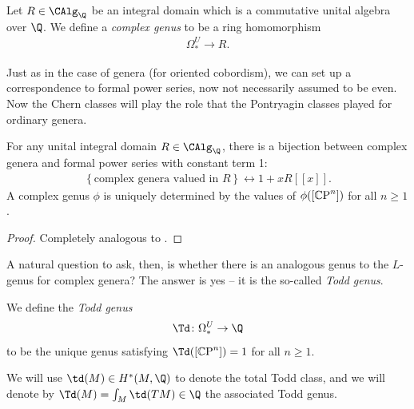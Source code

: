 \documentclass[11pt]{book}
\begin{document}
\begin{definition}\label{def:complex-genera}
Let $R\in \CAlg_\Q$ be an integral domain which is a commutative unital algebra over $\Q$. We define a \emph{complex genus} to be a ring homomorphism
\begin{align*}
    \Omega^U_\ast \to R.
\end{align*}
\end{definition}

Just as in the case of genera (for oriented cobordism), we can set up a correspondence to formal power series, now not necessarily assumed to be even. Now the Chern classes will play the role that the Pontryagin classes played for ordinary genera.

\begin{theorem}\label{thm:complex-genera} For any unital integral domain $R\in\CAlg_\Q$, there is a bijection between complex genera and formal power series with constant term 1:
\begin{align*}
    \left\{ \text{complex genera valued in }R \right\} \leftrightarrow 1 + xR[[x]].
\end{align*}
A complex genus $\phi$ is uniquely determined by the values of $\phi([{\mathbb{C}\text{P}}^n])$ for all $n\ge1$.
\end{theorem}
\begin{proof} Completely analogous to .
\end{proof}

A natural question to ask, then, is whether there is an analogous genus to the $L$-genus for complex genera? The answer is yes -- it is the so-called \emph{Todd genus}.

\begin{definition}\label{def:Todd-genus} We define the \emph{Todd genus}
\begin{align*}
    \Td \colon \Omega^U_\ast \to \Q
\end{align*}
to be the unique genus satisfying $\Td([\CP^n]) = 1$ for all $n\ge1$.
\end{definition}

\begin{notation} We will use $\td(M) \in H^\ast(M,\Q)$ to denote the total Todd class, and we will denote by $\Td(M) = \int_M \td(TM)\in \Q$ the associated Todd genus.
\end{notation}
\end{document}
